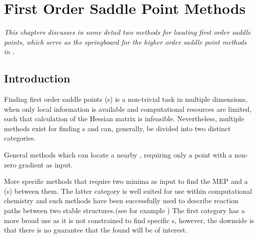 \chapter{First Order Saddle Point Methods}
\label{chap:saddle-point-methods}
\textit{This chapters discusses in some detail two methods for locating first order saddle points, which serve as the springboard for the higher order saddle point methods in .}
\section{Introduction}
Finding first order saddle points (s) is a non-trivial task in multiple dimensions, when only local information is available and computational resources are limited, such that calculation of the Hessian matrix is infeasible.
Nevertheless, multiple methods exist for finding s and can, generally, be divided into two distinct categories.
\item General methods which can locate a nearby , requiring only a point with a non-zero gradient as input.
\item More specific methods that require two minima as input to find the MEP and a  (s) between them.
\een
The latter category is well suited for use within computational chemistry and such methods have been successfully used to describe reaction paths between two stable structures.(see for example \cite{double-defect-2011})
The first category has a more broad use as it is not constrained to find specific s, however, the downside is that there is no guarantee that the found  will be of interest.





